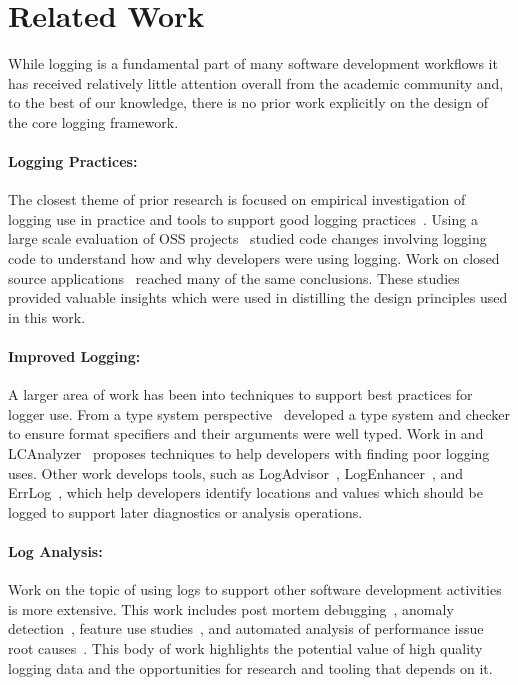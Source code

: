 \documentclass[sigplan,10pt,review]{acmart}
\begin{document}
\section{Related Work}
\label{sec:relwork}
While logging is a fundamental part of many software development workflows it has 
received relatively little attention overall from the academic community and, to the 
best of our knowledge, there is no prior work explicitly on the design of the core 
logging framework. 

\paragraph{Logging Practices:}
\noindent
The closest theme of prior research is focused on empirical investigation of logging 
use in practice and tools to support good logging practices~\cite{logstudy,logstudy2}. 
Using a large scale evaluation of OSS projects~\cite{logstudy} studied code changes 
involving logging code to understand how and why developers were using logging. 
Work on closed source applications~\cite{logstudy2} reached many of the same conclusions. 
These studies provided valuable insights which were used in distilling the design 
principles used in this work.

\paragraph{Improved Logging:}
\noindent
A larger area of work has been into techniques to support best practices for 
logger use. From a type system perspective~\cite{tyepcheckprintf} developed 
a type system and checker to ensure format specifiers and their arguments were 
well typed. Work in and LCAnalyzer~\cite{logginganti} proposes 
techniques to help developers with finding poor logging 
uses. Other work develops tools, such as  LogAdvisor~\cite{learnlog}, LogEnhancer~\cite{LogEnhancer}, 
and ErrLog~\cite{ErrLog}, which help developers identify locations and values which should 
be logged to support later diagnostics or analysis operations.

\paragraph{Log Analysis:}
\noindent
Work on the topic of using logs to support other software development activities is 
more extensive. This work includes post mortem debugging~\cite{loganalysis,sherlog,autolog}, anomaly 
detection~\cite{detection}, feature use studies~\cite{twitter}, and automated analysis of performance 
issue root causes~\cite{performance}. 
This body of work highlights the potential value of high quality logging data and the 
opportunities for research and tooling that depends on it.
\end{document}
